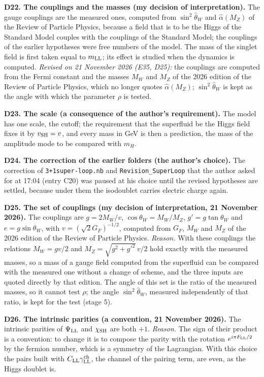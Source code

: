 \documentclass[
  10pt,
]{article}
\begin{document}
\textbf{D22. The couplings and the masses (my decision of
interpretation).} The gauge couplings are the measured ones, computed
from \(\sin^2\hat\theta_W\) and \(\hat\alpha(M_Z)\) of the Review of
Particle Physics, because a field that is to be the Higgs of the
Standard Model couples with the couplings of the Standard Model; the
couplings of the earlier hypotheses were free numbers of the model. The
mass of the singlet field is first taken equal to \(m_{\rm LL}\); its
effect is studied when the dynamics is computed. \emph{Revised on 21
November 2026 (E35, D25):} the couplings are computed from the Fermi
constant and the masses \(M_W\) and \(M_Z\) of the 2026 edition of the
Review of Particle Physics, which no longer quotes \(\hat\alpha(M_Z)\);
\(\sin^2\hat\theta_W\) is kept as the angle with which the parameter
\(\rho\) is tested.

\textbf{D23. The scale (a consequence of the author's requirement).} The
model has one scale, the cutoff; the requirement that the superfluid be
the Higgs field fixes it by \(v_{\rm SH}=v\), and every mass in GeV is
then a prediction, the mass of the amplitude mode to be compared with
\(m_H\).

\textbf{D24. The correction of the earlier folders (the author's
choice).} The correction of \texttt{3+1super-loop.nb} and
\texttt{Revision\_SuperLoop} that the author asked for at 17:04 (entry
C20) was paused at his choice until the revised hypotheses are settled,
because under them the isodoublet carries electric charge again.

\textbf{D25. The set of couplings (my decision of interpretation, 21
November 2026).} The couplings are \(g=2M_W/v\),
\(\cos\theta_W=M_W/M_Z\), \(g'=g\tan\theta_W\) and \(e=g\sin\theta_W\),
with \(v=(\sqrt2G_F)^{-1/2}\), computed from \(G_F\), \(M_W\) and
\(M_Z\) of the 2026 edition of the Review of Particle Physics.
\emph{Reason.} With these couplings the relations \(M_W=gv/2\) and
\(M_Z=\sqrt{g^2+g'^2}\,v/2\) hold exactly with the measured masses, so a
mass of a gauge field computed from the superfluid can be compared with
the measured one without a change of scheme, and the three inputs are
quoted directly by that edition. The angle of this set is the ratio of
the measured masses, so it cannot test \(\rho\); the angle
\(\sin^2\hat\theta_W\), measured independently of that ratio, is kept
for the test (stage 5).

\textbf{D26. The intrinsic parities (a convention, 21 November 2026).}
The intrinsic parities of \(\Psi_{\rm LL}\) and \(\chi_{\rm SH}\) are
both \(+1\). \emph{Reason.} The sign of their product is a convention:
to change it is to compose the parity with the rotation
\(e^{i\pi F_{\rm LL}/2}\) by the fermion number, which is a symmetry of
the Lagrangian. With this choice the pairs built with
\(C_{\rm LL}\gamma^{\rm ch}_{\rm LL}\), the channel of the pairing term,
are even, as the Higgs doublet is.
\end{document}
